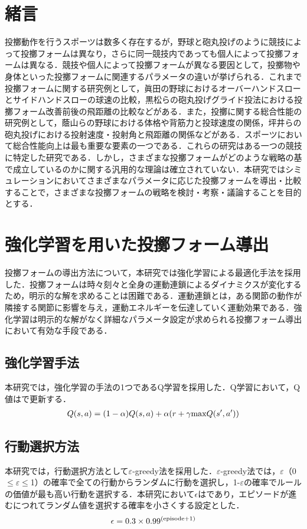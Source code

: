 \section{緒言}
投擲動作を行うスポーツは数多く存在するが，野球と砲丸投げのように競技によって投擲フォームは異なり，さらに同一競技内であっても個人によって投擲フォームは異なる．競技や個人によって投擲フォームが異なる要因として，投擲物や身体といった投擲フォームに関連するパラメータの違いが挙げられる．これまで投擲フォームに関する研究例として，眞田の野球におけるオーバーハンドスローとサイドハンドスローの球速の比較\cite{sanada}，黒松らの砲丸投げグライド投法における投擲フォーム改善前後の飛距離の比較\cite{kuromatsu}などがある．また，投擲に関する総合性能の研究例として，蔭山らの野球における体格や背筋力と投球速度の関係\cite{kageyama}，坪井らの砲丸投げにおける投射速度・投射角と飛距離の関係\cite{tsuboi}などがある．スポーツにおいて総合性能向上は最も重要な要素の一つである．これらの研究はある一つの競技に特定した研究である．しかし，さまざまな投擲フォームがどのような戦略の基で成立しているのかに関する汎用的な理論は確立されていない．本研究ではシミュレーションにおいてさまざまなパラメータに応じた投擲フォームを導出・比較することで，さまざまな投擲フォームの戦略を検討・考察・議論することを目的とする．\\
\section{強化学習を用いた投擲フォーム導出}
投擲フォームの導出方法について，本研究では強化学習による最適化手法を採用した．投擲フォームは時々刻々と全身の運動連鎖\cite{burkhart}によるダイナミクスが変化するため，明示的な解を求めることは困難である．運動連鎖とは，ある関節の動作が隣接する関節に影響を与え，運動エネルギーを伝達していく運動効果である．強化学習は明示的な解がなく詳細なパラメータ設定が求められる投擲フォーム導出において有効な手段である．
\subsection{強化学習手法}
本研究では，強化学習の手法の1つであるQ学習\cite{watkins}を採用した．Q学習において，Q値はで更新する．
\begin{eqnarray}
  \equlabel{1}
  Q(s,a)=(1-\alpha)Q(s,a)+\alpha(r+\gamma \mathrm{max}Q(s',a'))
\end{eqnarray}
\subsection{行動選択方法}
本研究では，行動選択方法として$\varepsilon$-greedy法\cite{greedy}を採用した．$\varepsilon$-greedy法では，$\varepsilon$（0$\leq$$\varepsilon$$\leq$1）の確率で全ての行動からランダムに行動を選択し，1-$\varepsilon$の確率でルールの価値が最も高い行動を選択する．本研究において$\epsilon$はであり，エピソードが進むにつれてランダム値を選択する確率を小さくする設定とした．
\begin{eqnarray}
  \equlabel{2}
  \epsilon = 0.3 \times 0.99^{(\mathrm{episode} + 1)}
\end{eqnarray}
